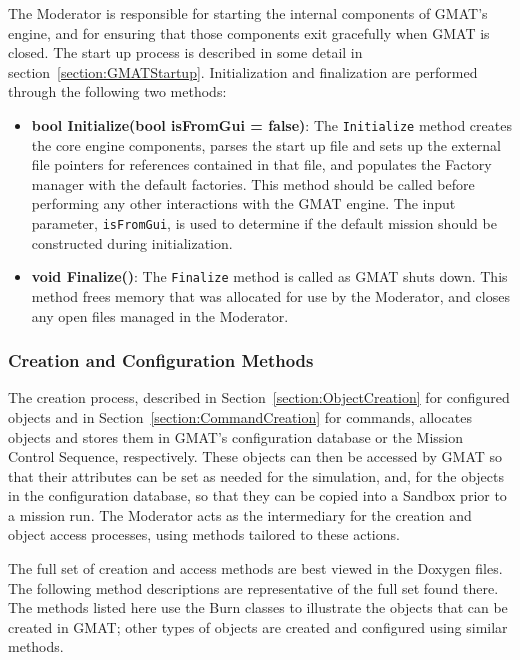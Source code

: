 The Moderator is responsible for starting the internal components of GMAT's engine, and for
ensuring that those components exit gracefully when GMAT is closed.  The start up process is
described in some detail in section~\ref{section:GMATStartup}.  Initialization and finalization are
performed through the following two methods:

\begin{itemize}
\item \textbf{bool Initialize(bool isFromGui = false)}:  The \texttt{Initialize} method creates the
core engine components, parses the start up file and sets up the external file pointers for
references contained in that file, and populates the Factory manager with the default factories.
This method should be called before performing any other interactions with the GMAT engine.  The
input parameter, \texttt{isFromGui}, is used to determine if the default mission should be
constructed during initialization.
\item \textbf{void Finalize()}:  The \texttt{Finalize} method is called as GMAT shuts down.  This
method frees memory that was allocated for use by the Moderator, and closes any open files managed
in the Moderator.
\end{itemize}

\subsubsection{Creation and Configuration Methods}

The creation process, described in Section~\ref{section:ObjectCreation} for configured objects and
in Section~\ref{section:CommandCreation} for commands, allocates objects and stores them in GMAT's
configuration database or the Mission Control Sequence, respectively.  These objects can then be
accessed by GMAT so that their attributes can be set as needed for the simulation, and, for the
objects in the configuration database, so that they can be copied into a Sandbox prior to a mission
run. The Moderator acts as the intermediary for the creation and object access processes, using
methods tailored to these actions.

The full set of creation and access methods are best viewed in the Doxygen files.  The following
method descriptions are representative of the full set found there.  The methods listed here use
the Burn classes to illustrate the objects that can be created in GMAT; other types of objects are
created and configured using similar methods.

